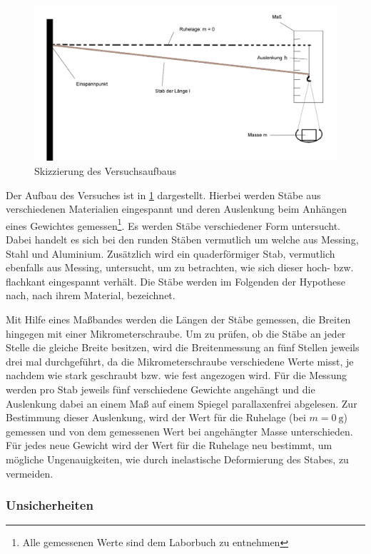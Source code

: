 	\begin{figure}[ht]
		\centering
		\includegraphics[width=\textwidth]{StabAuslenkungSkizze.png}
		\caption{Skizzierung des Versuchsaufbaus}
		\label{abb:Versuchsskizze1}	
	\end{figure}	
	Der Aufbau des Versuches ist in \cref{abb:Versuchsskizze1} dargestellt. Hierbei werden Stäbe aus verschiedenen Materialien eingespannt und deren Auslenkung beim Anhängen eines Gewichtes gemessen\footnote{Alle gemessenen Werte sind dem Laborbuch zu entnehmen}. 
	Es werden Stäbe verschiedener Form untersucht. Dabei handelt es sich bei den runden Stäben vermutlich um welche aus Messing, Stahl und Aluminium. Zusätzlich wird ein quaderförmiger Stab, vermutlich ebenfalls aus Messing, untersucht, um zu betrachten, wie sich dieser hoch- bzw. flachkant eingespannt verhält. Die Stäbe werden im Folgenden der Hypothese nach, nach ihrem Material, bezeichnet.
	
	Mit Hilfe eines Maßbandes werden die Längen der Stäbe gemessen, die Breiten hingegen mit einer Mikrometerschraube. Um zu prüfen, ob die Stäbe an jeder Stelle die gleiche Breite besitzen, wird die Breitenmessung an fünf Stellen jeweils drei mal durchgeführt, da die Mikrometerschraube verschiedene Werte misst, je nachdem wie stark geschraubt bzw. wie fest angezogen wird. 
	Für die Messung werden pro Stab jeweils fünf verschiedene Gewichte angehängt und die Auslenkung dabei an einem Maß auf einem Spiegel parallaxenfrei abgelesen. Zur Bestimmung dieser Auslenkung, wird der Wert für die Ruhelage (bei $m=\SI{0}{\g}$) gemessen und von dem gemessenen Wert bei angehängter Masse unterschieden. Für jedes neue Gewicht wird der Wert für die Ruhelage neu bestimmt, um mögliche Ungenauigkeiten, wie durch inelastische Deformierung des Stabes, zu vermeiden.
	
	\subsubsection*{Unsicherheiten}
	
